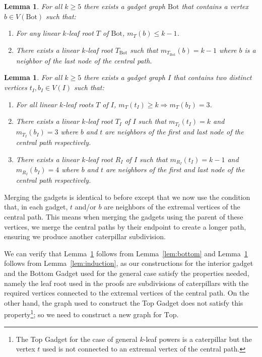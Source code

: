 \documentclass[11pt,letter]{article}
\newtheorem{lemma}[theorem]{Lemma}
\theoremstyle{remark}
\newcommand{\T}{\text{Top}}
\newcommand{\B}{\text{Bot}}
\begin{document}
\begin{lemma}\label{lem:bottom-caterpillar}
For all $k\geq 5$ there exists a gadget graph $\B$ that contains a vertex $b \in V(\B)$ such that:
\begin{enumerate}
        \item For any linear $k$-leaf root $T$ of $\B$, $m_T(b) \leq k-1$.
        \item There exists a linear $k$-leaf root $T_{\B}$ such that $m_{T_{\B}}(b) = k-1$ where $b$ is a neighbor of the last node of the central path.
\end{enumerate}
\end{lemma}

\begin{lemma}\label{lem:induction-caterpillar}
For all $k\geq 5$ there exists a gadget graph $I$ that contains two distinct vertices $t_I,b_I\in V(I)$ such that:
\begin{enumerate}
        \item For all linear $k$-leaf roots $T$ of $I$, $m_T(t_I)\geq k\Longrightarrow m_T(b_I)=3$.
        \item There exists a linear $k$-leaf root $T_I$ of $I$ such that $m_{T_I}(t_I)=k$ and $m_{T_I}(b_I)=3$ where $b$ and $t$ are neighbors of the first and last node of the central path respectively.
        \item There exists a linear $k$-leaf root $R_I$ of $I$ such that $m_{R_I}(t_I)=k-1$ and $m_{R_I}(b_I)=4$ where $b$ and $t$ are neighbors of the first and last node of the central path respectively.
    \end{enumerate}    
\end{lemma}

Merging the gadgets is identical to before except that we now use the condition that, in each gadget, $t$ and/or $b$ are neighbors of the extremal vertices of the central path. This means when merging the gadgets using the parent of these vertices, we merge the central paths by their endpoint to create a longer path, ensuring we produce another caterpillar subdivision.

We can verify that Lemma~\ref{lem:bottom-caterpillar} follows from Lemma~\ref{lem:bottom} and Lemma~\ref{lem:induction-caterpillar} follows from Lemma~\ref{lem:induction}, as our constructions for the interior gadget and the Bottom Gadget used for the general case satisfy the properties needed, namely the leaf root used in the proofs are subdivisions of caterpillars with the required vertices connected to the extremal vertices of the central path. On the other hand, the graph used to construct the Top Gadget does not satisfy this property\footnote{The Top Gadget for the case of general $k$-leaf powers is a caterpillar but the vertex $t$ used is not connected to an extremal vertex of the central path.}; so we need to construct a new graph for $\T$.
\end{document}
